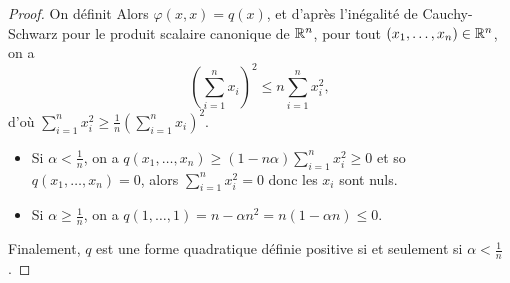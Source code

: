 \documentclass[12pt]{article}
\begin{document}
\begin{proof}
	On définit
	Alors $\varphi(x,x)=q(x)$, et d'après l'inégalité de Cauchy-Schwarz pour le produit scalaire canonique de $\mathbb{R}^{n}$, pour tout $(x_1,\dots,x_n)\in\mathbb{R}^{n}$, on a 
	\begin{equation}
		\left(\sum_{i=1}^{n}x_{i}\right)^{2}\leqslant n\sum_{i=1}^{n}x_{i}^{2},
	\end{equation}
	d'où $\sum_{i=1}^{n}x_{i}^{2}\geqslant\frac{1}{n}\left(\sum_{i=1}^{n}x_{i}\right)^{2}$.

	\begin{itemize}
		\item Si $\alpha<\frac{1}{n}$, on a $q(x_1,\dots,x_n)\geqslant\left(1-n\alpha\right)\sum_{i=1}^{n}x_{i}^{2}\geqslant0$ et so $q(x_1,\dots,x_n)=0$, alors $\sum_{i=1}^{n}x_{i}^{2}=0$ donc les $x_i$ sont nuls.
		\item Si $\alpha\geqslant\frac{1}{n}$, on a $q(1,\dots,1)=n-\alpha n^{2}=n(1-\alpha n)\leqslant0$.
	\end{itemize}
	Finalement, $q$ est une forme quadratique définie positive si et seulement si $\alpha<\frac{1}{n}$.
\end{proof}
\end{document}
